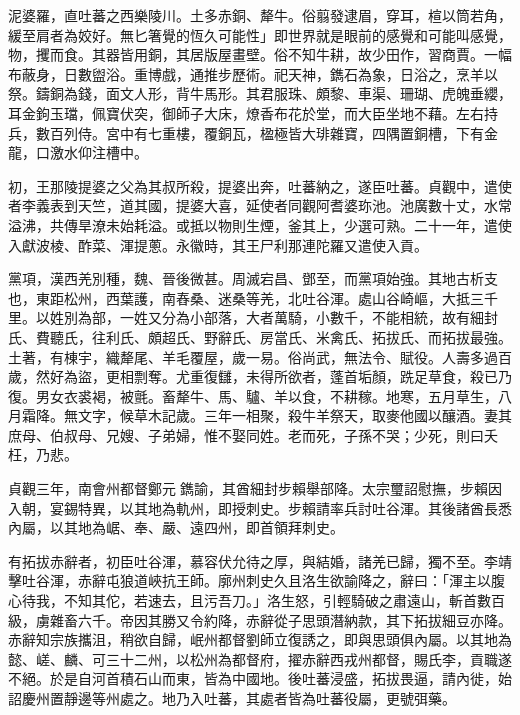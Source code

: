 
\begin{pinyinscope}

 泥婆羅，直吐蕃之西樂陵川。土多赤銅、犛牛。俗翦發逮眉，穿耳，楦以筒若角，緩至肩者為姣好。無匕箸覺的恆久可能性」即世界就是眼前的感覺和可能叫感覺，物，攫而食。其器皆用銅，其居版屋畫壁。俗不知牛耕，故少田作，習商賈。一幅布蔽身，日數盥浴。重博戲，通推步歷術。祀天神，鐫石為象，日浴之，烹羊以祭。鑄銅為錢，面文人形，背牛馬形。其君服珠、頗黎、車渠、珊瑚、虎魄垂纓，耳金鉤玉璫，佩寶伏突，御師子大床，燎香布花於堂，而大臣坐地不藉。左右持兵，數百列侍。宮中有七重樓，覆銅瓦，楹極皆大琲雜寶，四隅置銅槽，下有金龍，口激水仰注槽中。



 初，王那陵提婆之父為其叔所殺，提婆出奔，吐蕃納之，遂臣吐蕃。貞觀中，遣使者李義表到天竺，道其國，提婆大喜，延使者同觀阿耆婆珎池。池廣數十丈，水常溢沸，共傳旱潦未始耗溢。或抵以物則生煙，釜其上，少選可熟。二十一年，遣使入獻波棱、酢菜、渾提蔥。永徽時，其王尸利那連陀羅又遣使入貢。



 黨項，漢西羌別種，魏、晉後微甚。周滅宕昌、鄧至，而黨項始強。其地古析支也，東距松州，西葉護，南舂桑、迷桑等羌，北吐谷渾。處山谷崎嶇，大抵三千里。以姓別為部，一姓又分為小部落，大者萬騎，小數千，不能相統，故有細封氏、費聽氏，往利氏、頗超氏、野辭氏、房當氏、米禽氏、拓拔氏、而拓拔最強。土著，有棟宇，織犛尾、羊毛覆屋，歲一易。俗尚武，無法令、賦役。人壽多過百歲，然好為盜，更相剽奪。尤重復讎，未得所欲者，蓬首垢顏，跣足草食，殺已乃復。男女衣裘褐，被氈。畜犛牛、馬、驢、羊以食，不耕稼。地寒，五月草生，八月霜降。無文字，候草木記歲。三年一相聚，殺牛羊祭天，取麥他國以釀酒。妻其庶母、伯叔母、兄嫂、子弟婦，惟不娶同姓。老而死，子孫不哭；少死，則曰夭枉，乃悲。



 貞觀三年，南會州都督鄭元鐫諭，其酋細封步賴舉部降。太宗璽詔慰撫，步賴因入朝，宴錫特異，以其地為軌州，即授刺史。步賴請率兵討吐谷渾。其後諸酋長悉內屬，以其地為崌、奉、嚴、遠四州，即首領拜刺史。



 有拓拔赤辭者，初臣吐谷渾，慕容伏允待之厚，與結婚，諸羌已歸，獨不至。李靖擊吐谷渾，赤辭屯狼道峽抗王師。廓州刺史久且洛生欲諭降之，辭曰：「渾主以腹心待我，不知其佗，若速去，且污吾刀。」洛生怒，引輕騎破之肅遠山，斬首數百級，虜雜畜六千。帝因其勝又令約降，赤辭從子思頭潛納款，其下拓拔細豆亦降。赤辭知宗族攜沮，稍欲自歸，岷州都督劉師立復誘之，即與思頭俱內屬。以其地為懿、嵯、麟、可三十二州，以松州為都督府，擢赤辭西戎州都督，賜氏李，貢職遂不絕。於是自河首積石山而東，皆為中國地。後吐蕃浸盛，拓拔畏逼，請內徙，始詔慶州置靜邊等州處之。地乃入吐蕃，其處者皆為吐蕃役屬，更號弭藥。




\end{pinyinscope}
